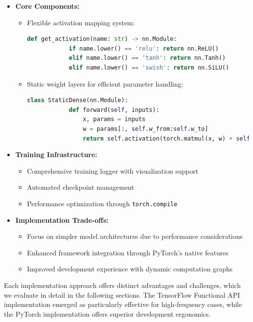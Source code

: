 \documentclass[10pt,journal,compsoc,onecolumn]{IEEEtran}
\begin{document}
\begin{itemize}
    \item \textbf{Core Components:}
    \begin{itemize}
        \item Flexible activation mapping system:
        \begin{lstlisting}[language=Python, gobble=8]
        def get_activation(name: str) -> nn.Module:
            if name.lower() == 'relu': return nn.ReLU()
            elif name.lower() == 'tanh': return nn.Tanh()
            elif name.lower() == 'swish': return nn.SiLU()
        \end{lstlisting}
        
        \item Static weight layers for efficient parameter handling:
        \begin{lstlisting}[language=Python, gobble=8]
        class StaticDense(nn.Module):
            def forward(self, inputs):
                x, params = inputs
                w = params[:, self.w_from:self.w_to]
                return self.activation(torch.matmul(x, w) + self.bias)
        \end{lstlisting}
    \end{itemize}
    
    \item \textbf{Training Infrastructure:}
    \begin{itemize}
        \item Comprehensive training logger with visualization support
        \item Automated checkpoint management
        \item Performance optimization through \texttt{torch.compile}
    \end{itemize}
    
    \item \textbf{Implementation Trade-offs:}
    \begin{itemize}
        \item Focus on simpler model architectures due to performance considerations
        \item Enhanced framework integration through PyTorch's native features
        \item Improved development experience with dynamic computation graphs
    \end{itemize}
\end{itemize}

Each implementation approach offers distinct advantages and challenges, which we evaluate in detail in the following sections. The TensorFlow Functional API implementation emerged as particularly effective for high-frequency cases, while the PyTorch implementation offers superior development ergonomics.
\end{document}
